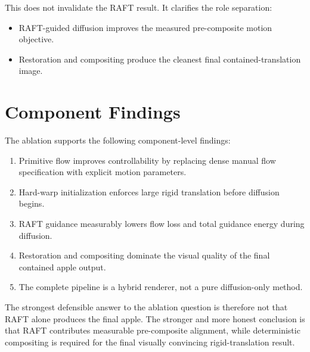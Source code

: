 This does not invalidate the RAFT result. It clarifies the role separation:

\begin{itemize}
  \item RAFT-guided diffusion improves the measured pre-composite motion objective.
  \item Restoration and compositing produce the cleanest final contained-translation image.
\end{itemize}

\section{Component Findings}

The ablation supports the following component-level findings:

\begin{enumerate}
  \item Primitive flow improves controllability by replacing dense manual flow specification with explicit motion parameters.
  \item Hard-warp initialization enforces large rigid translation before diffusion begins.
  \item RAFT guidance measurably lowers flow loss and total guidance energy during diffusion.
  \item Restoration and compositing dominate the visual quality of the final contained apple output.
  \item The complete pipeline is a hybrid renderer, not a pure diffusion-only method.
\end{enumerate}

The strongest defensible answer to the ablation question is therefore not that RAFT alone produces the final apple. The stronger and more honest conclusion is that RAFT contributes measurable pre-composite alignment, while deterministic compositing is required for the final visually convincing rigid-translation result.

\FloatBarrier
